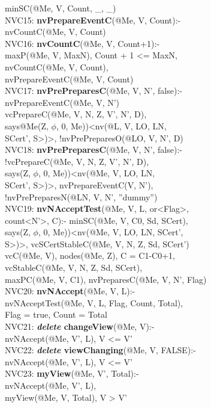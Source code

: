 \begin{code}
\> minSC(@Me, V, Count, \_, \_)\\
NVC15: \textbf{nvPrepareEventC}(@Me, V, Count):-\\
\> nvCountC(@Me, V, Count)\\
NVC16: \textbf{nvCountC}(@Me, V, Count+1):-\\
\> maxP(@Me, V, MaxN), Count + 1 <= MaxN, \\
\> nvCountC(@Me, V, Count), \\
\> nvPrepareEventC(@Me, V, Count) \\
NVC17: \textbf{nvPrePreparesC}(@Me, V, N', false):-\\
\> nvPrepareEventC(@Me, V, N')\\
\> vcPrepareC(@Me, V, N, Z, V', N', D),\\
\> says@Me(Z, $\phi$, 0, Me))<nv(@L, V, LO, LN, \\
\> SCert', S>)>, !nvPrePreparesO(@LO, V, N', D)\\
NVC18: \textbf{nvPrePreparesC}(@Me, V, N', false):-\\
\> !vcPrepareC(@Me, V, N, Z, V', N', D),\\
\> says(Z, $\phi$, 0, Me))<nv(@Me, V, LO, LN, \\
\> SCert', S>)>, nvPrepareEventC(V, N'), \\
\> !nvPrePreparesN(@LN, V, N', ''dummy'')\\
NVC19: \textbf{nvNAcceptTest}(@Me, V, L, or<Flag>, \\
\> count<N'>, C):- minSC(@Me, V, C0, Sd, SCert), \\
\> says(Z, $\phi$, 0, Me))<nv(@Me, V, LO, LN, SCert', \\
\> S>)>, vcSCertStableC(@Me, V, N, Z, Sd, SCert')\\
\> vcC(@Me, V), nodes(@Me, Z), C = C1-C0+1, \\
\> vcStableC(@Me, V, N, Z, Sd, SCert), \\
\> maxPC(@Me, V, C1), nvPreparesC(@Me, V, N', Flag)\\
NVC20: \textbf{nvNAccept}(@Me, V, L):- \\
\> nvNAcceptTest(@Me, V, L, Flag, Count, Total), \\
\> Flag = true, Count = Total\\
NVC21: \textbf{\textit{delete} changeView}(@Me, V):-\\
\> nvNAccept(@Me, V', L), V <= V'\\
NVC22: \textbf{\textit{delete} viewChanging}(@Me, V, FALSE):-\\
\> nvNAccept(@Me, V', L), V <= V'\\
NVC23: \textbf{myView}(@Me, V', Total):-\\
\> nvNAccept(@Me, V', L),\\
\> myView(@Me, V, Total), V > V'\\
\end{code}
